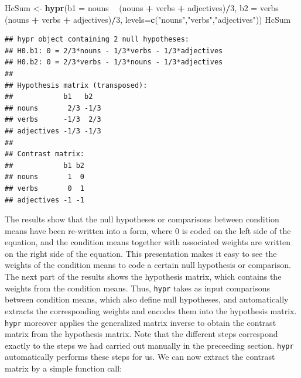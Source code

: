 \documentclass[12pt,]{krantz}
\newenvironment{Shaded}{\begin{snugshade}}{\end{snugshade}}
\newcommand{\DataTypeTok}[1]{\textcolor[rgb]{0.13,0.29,0.53}{#1}}
\newcommand{\DecValTok}[1]{\textcolor[rgb]{0.00,0.00,0.81}{#1}}
\newcommand{\KeywordTok}[1]{\textcolor[rgb]{0.13,0.29,0.53}{\textbf{#1}}}
\newcommand{\NormalTok}[1]{#1}
\newcommand{\OperatorTok}[1]{\textcolor[rgb]{0.81,0.36,0.00}{\textbf{#1}}}
\newcommand{\StringTok}[1]{\textcolor[rgb]{0.31,0.60,0.02}{#1}}
\begin{document}
\begin{Shaded}
\begin{Highlighting}[]
\NormalTok{HcSum <-}\StringTok{ }\KeywordTok{hypr}\NormalTok{(}\DataTypeTok{b1 =}\NormalTok{ nouns }\OperatorTok{~}\StringTok{ }\NormalTok{(nouns }\OperatorTok{+}\StringTok{ }\NormalTok{verbs }\OperatorTok{+}\StringTok{ }\NormalTok{adjectives)}\OperatorTok{/}\DecValTok{3}\NormalTok{, }
              \DataTypeTok{b2 =}\NormalTok{ verbs }\OperatorTok{~}\StringTok{ }\NormalTok{(nouns }\OperatorTok{+}\StringTok{ }\NormalTok{verbs }\OperatorTok{+}\StringTok{ }\NormalTok{adjectives)}\OperatorTok{/}\DecValTok{3}\NormalTok{, }
              \DataTypeTok{levels=}\KeywordTok{c}\NormalTok{(}\StringTok{"nouns"}\NormalTok{,}\StringTok{"verbs"}\NormalTok{,}\StringTok{"adjectives"}\NormalTok{))}
\NormalTok{HcSum}
\end{Highlighting}
\end{Shaded}

\begin{verbatim}
## hypr object containing 2 null hypotheses:
## H0.b1: 0 = 2/3*nouns - 1/3*verbs - 1/3*adjectives
## H0.b2: 0 = 2/3*verbs - 1/3*nouns - 1/3*adjectives
## 
## Hypothesis matrix (transposed):
##            b1   b2  
## nouns       2/3 -1/3
## verbs      -1/3  2/3
## adjectives -1/3 -1/3
## 
## Contrast matrix:
##            b1 b2
## nouns       1  0
## verbs       0  1
## adjectives -1 -1
\end{verbatim}

The results show that the null hypotheses or comparisons between condition means have been re-written into a form, where \(0\) is coded on the left side of the equation, and the condition means together with associated weights are written on the right side of the equation. This presentation makes it easy to see the weights of the condition means to code a certain null hypothesis or comparison. The next part of the results shows the hypothesis matrix, which contains the weights from the condition means. Thus, \texttt{hypr} takes as input comparisons between condition means, which also define null hypotheses, and automatically extracts the corresponding weights and encodes them into the hypothesis matrix. \texttt{hypr} moreover applies the generalized matrix inverse to obtain the contrast matrix from the hypothesis matrix. Note that the different steps correspond exactly to the steps we had carried out manually in the preceeding section. \texttt{hypr} automatically performs these steps for us. We can now extract the contrast matrix by a simple function call:
\end{document}
